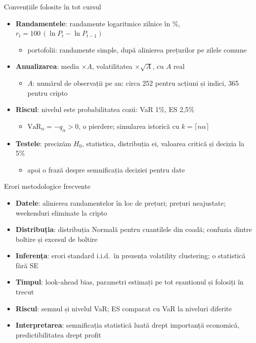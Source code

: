 \begin{frame}{Convențiile folosite în tot cursul}
\itemsize{\small}
\begin{itemize}
    \item \textbf{Randamentele}: randamente logaritmice zilnice în \%, $r_t = 100\,(\ln P_t - \ln P_{t-1})$
    \begin{itemize}
        \item portofolii: randamente simple, după alinierea prețurilor pe zilele comune
    \end{itemize}
    \item \textbf{Anualizarea}: media $\times A$, volatilitatea $\times\sqrt{A}$, cu $A$ real
    \begin{itemize}
        \item $A$: numărul de observații pe an: circa 252 pentru acțiuni și indici, 365 pentru cripto
    \end{itemize}
    \item \textbf{Riscul}: nivelul este probabilitatea cozii: VaR 1\%, ES 2,5\%
    \begin{itemize}
        \item $\mathrm{VaR}_\alpha = -q_\alpha > 0$, o pierdere; simularea istorică cu $k = \lceil n\alpha \rceil$
    \end{itemize}
    \item \textbf{Testele}: precizăm $H_0$, statistica, distribuția ei, valoarea critică și decizia la 5\%
    \begin{itemize}
        \item apoi o frază despre semnificația deciziei pentru date
    \end{itemize}
\end{itemize}
\end{frame}

\begin{frame}{Erori metodologice frecvente}
\itemsize{\small}
\begin{itemize}
    \item \textbf{Datele}: alinierea randamentelor în loc de prețuri; prețuri neajustate; weekenduri eliminate la cripto
    \item \textbf{Distribuția}: distribuția Normală pentru cuantilele din coadă; confuzia dintre boltire și excesul de boltire
    \item \textbf{Inferența}: erori standard i.i.d.\ în prezența volatility clustering; o statistică fără SE
    \item \textbf{Timpul}: look-ahead bias, parametri estimați pe tot eșantionul și folosiți în trecut
    \item \textbf{Riscul}: semnul și nivelul VaR; ES comparat cu VaR la niveluri diferite
    \item \textbf{Interpretarea}: semnificația statistică luată drept importanță economică, predictibilitatea drept profit
\end{itemize}
\end{frame}


